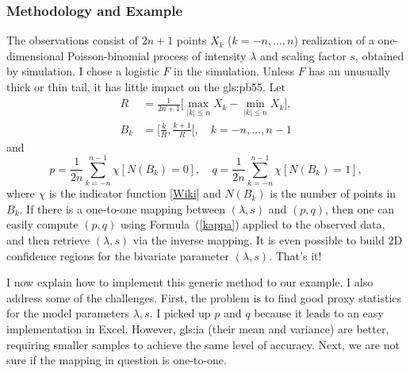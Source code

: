 \documentclass[10pt]{article}
\begin{document}
\subsubsection{Methodology and Example}\label{cils1}

The observations consist of $2n+1$ points $X_k$ ($k=-n,\dots,n$) realization of a one-dimensional Poisson-binomial process of intensity $\lambda$ and scaling factor $s$, obtained by simulation.  I chose a logistic $F$ in the simulation. Unless $F$ has an unusually thick or thin tail, it has little impact on the \gls{gls:pb55}. Let
\begin{align}
R & =\frac{1}{2n+1}\Big[\max_{|k|\leq n} X_k-\min_{|k|\leq n} X_k\Big], \label{bk00} \\
B_k  & = \Big[\frac{k}{R}, \frac{k+1}{R}\Big[, \quad k=-n,\dots,n-1 \label{bk01}
\end{align}
and
\begin{equation}
p  =\frac{1}{2n} \sum_{k=-n}^{n-1} \chi[N(B_k)=0], \quad
q  =\frac{1}{2n} \sum_{k=-n}^{n-1} \chi[N(B_k)=1],
 \label{kappa}
\end{equation}
where $\chi$ is the indicator function
[\href{https://en.wikipedia.org/wiki/Indicator_function}{Wiki}] and $N(B_k)$ is the number of points in $B_k$. If there is a one-to-one mapping between $(\lambda,s)$ and $(p,q)$, then one can easily compute $(p,q)$ using Formula~(\ref{kappa}) applied to the observed data, and then retrieve $(\lambda,s)$ via the inverse mapping. It is even possible to build 2D confidence regions for the bivariate parameter $(\lambda, s)$. That's it!

I now explain how to implement this generic method to our example. I also address some of the challenges. First, the problem is to find good proxy statistics for
the model parameters $\lambda,s$. I picked up $p$ and $q$ because it leads to an easy implementation in Excel. However,
\gls{gls:ia} (their mean and variance)
are better, requiring smaller samples to achieve the same level of accuracy. Next, we are not sure if the mapping in question is one-to-one.
\end{document}
